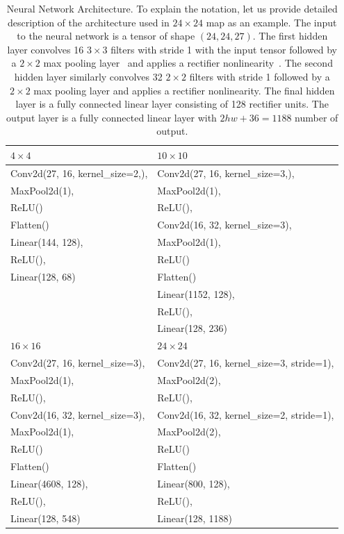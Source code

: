 \documentclass[letterpaper]{article}
\begin{document}
\begin{table}[t]
\centering
\caption{Neural Network Architecture. To explain the notation, let us provide detailed description of the architecture used in $24\times24$ map as an example. The input to the neural network is a tensor of shape $(24, 24, 27)$.
The first hidden layer convolves 16 $3\times3$ filters with stride 1 with the input tensor followed by a $2\times 2$ max pooling layer~\protect\cite{ranzato2007unsupervised}
and applies a  rectifier nonlinearity~\protect\cite{nair2010rectified}. The second hidden layer similarly convolves 32 $2\times2$ filters with stride 1 followed by a $2\times 2$ max pooling layer and applies a  rectifier nonlinearity. The final hidden layer is a fully connected linear layer consisting of 128 rectifier units. The output layer is a fully connected linear layer with $2hw + 36=1188$ number of output.
}
\begin{tabular}{ll}
\toprule
$4\times4$ &$10\times10$ \\
\midrule
Conv2d(27, 16, kernel\_size=2,),&   Conv2d(27, 16, kernel\_size=3,), \\
MaxPool2d(1),&                     MaxPool2d(1), \\
ReLU()&                            ReLU(), \\
Flatten()&                         Conv2d(16, 32, kernel\_size=3), \\
Linear(144, 128),&              MaxPool2d(1), \\
ReLU(),&                           ReLU() \\
Linear(128, 68)&         Flatten() \\
                                   &Linear(1152, 128), \\
                                   &ReLU(), \\
                                   &Linear(128, $236$) \\
\midrule
$16\times16$ &$24\times24$ \\
\midrule
Conv2d(27, 16, kernel\_size=3),&  Conv2d(27, 16, kernel\_size=3, stride=1), \\
MaxPool2d(1),&                   MaxPool2d(2), \\
ReLU(),&                         ReLU(), \\
Conv2d(16, 32, kernel\_size=3),&  Conv2d(16, 32, kernel\_size=2, stride=1), \\
MaxPool2d(1),&                   MaxPool2d(2), \\
ReLU()&                          ReLU() \\
Flatten()&                       Flatten() \\
Linear(4608, 128),&          Linear(800, 128), \\
ReLU(),&                         ReLU(), \\
Linear(128, 548)&       Linear(128, 1188) \\
\bottomrule
\end{tabular}

\label{tab:architecture}
\end{table}
\end{document}
